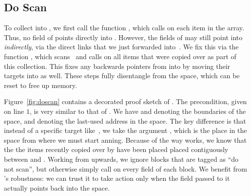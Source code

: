 \subsection{Do Scan}
\label{sec:gcdoscan}

To collect  into , 
we first call the function , which calls  
on each item in the  array. 
Thus, no field of  points directly into . 
However, the fields of  may still point into  \emph{indirectly}, 
via the direct links that we just forwarded into~.
We fix this via the function 
, which scans~ and calls 
 on all items that were copied over as part of this collection.
This fixes any backwards pointers from  into  by moving
their targets into  as well.
These steps fully disentangle  from the 
 space, which can be reset to free up memory. 



Figure~\ref{fig:doscan} contains a decorated proof sketch of .
The precondition, given on line $1$, is very similar to that of 
. We have  and  denoting the boundaries
of the  space, and  denoting the last-used address
in the  space. The key difference is that instead of a specific
target like~, we take the argument , 
which is the place in the  space from where we must start anning.
Because of the way  works, we know that the 
the items recently copied over by  
have been placed placed contiguously between  and . 
Working from  upwards, we ignore blocks that are tagged as 
``do not scan'', but otherwise simply call  on every field
of each block. We benefit from 's robustness: we can trust it to 
take action only when the field passed to it actually points back into the 
 space. 

